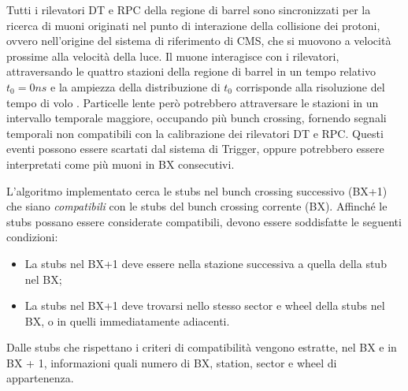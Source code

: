 Tutti i rilevatori DT e RPC della regione di barrel sono sincronizzati per la ricerca di muoni originati nel punto di interazione della collisione dei protoni, ovvero nell'origine del sistema di riferimento di CMS, che si muovono a velocità prossime alla velocità della luce. Il muone interagisce con i rilevatori, attraversando le quattro stazioni della regione di barrel in un tempo relativo $t_0 = 0 \si{ns}$ e la ampiezza della distribuzione di $t_0$ corrisponde alla risoluzione del tempo di volo \cite{MasterThesisGioMoc}. Particelle lente però potrebbero attraversare le stazioni in un intervallo temporale maggiore, occupando più bunch crossing, fornendo segnali temporali non compatibili con la calibrazione dei rilevatori DT e RPC. Questi eventi possono essere scartati dal sistema di Trigger, oppure potrebbero essere interpretati come più muoni in BX consecutivi.


\begin{figure}[t]
  \centering
  \centering
  \caption{}
  \label{fig:CMSLayout}
\end{figure}


L'algoritmo implementato cerca le stubs nel bunch crossing successivo (BX+1) che siano \textit{compatibili} con le stubs del bunch crossing corrente (BX). Affinché le stubs possano essere considerate compatibili, devono essere soddisfatte le seguenti condizioni:

\begin{itemize}
  \item La stubs nel BX+1 deve essere nella stazione successiva a quella della stub nel BX;
  \item La stubs nel BX+1 deve trovarsi nello stesso sector e wheel della stubs nel BX, o in quelli immediatamente adiacenti.
\end{itemize}

Dalle stubs che rispettano i criteri di compatibilità vengono estratte, nel BX e in BX + 1, informazioni quali numero di BX, station, sector e wheel di appartenenza.

